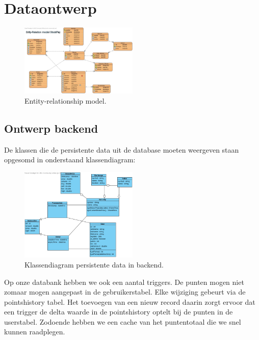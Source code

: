 %
%

\chapter{Dataontwerp}

\begin{figure}[h!]
	\centering
		\includegraphics[width=0.5\textwidth]{images/realisatie/ER_Diagram}
	\caption{Entity-relationship model.}
\end{figure}

\section{Ontwerp backend}
De klassen die de persistente data uit de database moeten weergeven staan opgesomd in onderstaand klassendiagram:

\begin{figure}[h!]
	\centering
		\includegraphics[width=0.5\textwidth]{images/realisatie/Class_Diagram}
	\caption{Klassendiagram persistente data in backend.}
\end{figure}

Op onze databank hebben we ook een aantal triggers. De punten mogen niet zomaar mogen aangepast in de gebruikerstabel. Elke wijziging gebeurt via de pointshistory tabel. Het toevoegen van een nieuw record daarin zorgt ervoor dat een trigger de delta waarde in de pointshistory optelt bij de punten in de userstabel. Zodoende hebben we een cache van het puntentotaal die we snel kunnen raadplegen.

